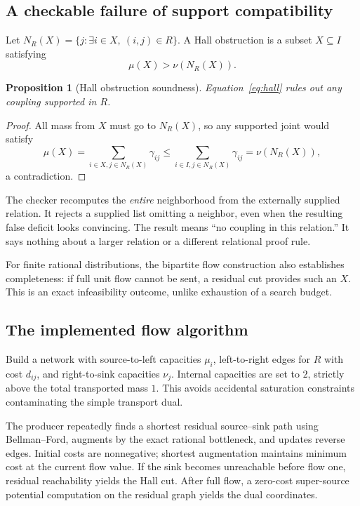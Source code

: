 \documentclass[11pt,letterpaper]{article}
\newtheorem{proposition}[theorem]{Proposition}
\theoremstyle{definition}\newtheorem{definition}[theorem]{Definition}
\theoremstyle{remark}\newtheorem{remark}[theorem]{Remark}
\begin{document}
\subsection{A checkable failure of support compatibility}
Let $N_R(X)=\{j:\exists i\in X,\ (i,j)\in R\}$. A Hall obstruction is a subset $X\subseteq I$ satisfying
\begin{equation}\label{eq:hall}
 \mu(X)>\nu(N_R(X)).
\end{equation}

\begin{proposition}[Hall obstruction soundness]
Equation~\eqref{eq:hall} rules out any coupling supported in $R$.
\end{proposition}
\begin{proof}
All mass from $X$ must go to $N_R(X)$, so any supported joint would satisfy
\[
 \mu(X)=\sum_{i\in X,j\in N_R(X)}\gamma_{ij}
 \le\sum_{i\in I,j\in N_R(X)}\gamma_{ij}
 =\nu(N_R(X)),
\]
a contradiction.
\end{proof}
The checker recomputes the \emph{entire} neighborhood from the externally supplied relation. It rejects a supplied list omitting a neighbor, even when the resulting false deficit looks convincing. The result means ``no coupling in this relation.'' It says nothing about a larger relation or a different relational proof rule.

For finite rational distributions, the bipartite flow construction also establishes completeness: if full unit flow cannot be sent, a residual cut provides such an $X$. This is an exact infeasibility outcome, unlike exhaustion of a search budget.

\subsection{The implemented flow algorithm}
Build a network with source-to-left capacities $\mu_i$, left-to-right edges for $R$ with cost $d_{ij}$, and right-to-sink capacities $\nu_j$. Internal capacities are set to $2$, strictly above the total transported mass $1$. This avoids accidental saturation constraints contaminating the simple transport dual.

The producer repeatedly finds a shortest residual source--sink path using Bellman--Ford, augments by the exact rational bottleneck, and updates reverse edges. Initial costs are nonnegative; shortest augmentation maintains minimum cost at the current flow value. If the sink becomes unreachable before flow one, residual reachability yields the Hall cut. After full flow, a zero-cost super-source potential computation on the residual graph yields the dual coordinates.
\end{document}
